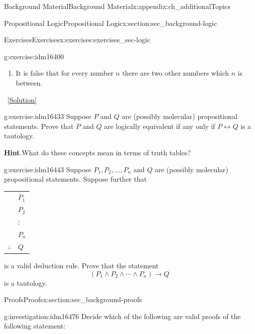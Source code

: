 \documentclass[oneside,10pt,]{book}
\numberwithin{equation}{chapter}
\newcommand{\hrulethin}  {\noalign{\hrule height 0.04em}}
\def\iff{\leftrightarrow}
\def\imp{\rightarrow}
\begin{document}
\begin{appendixptx}{Background Material}{}{Background Material}{}{}{x:appendix:ch_additionalTopics}
\begin{sectionptx}{Propositional Logic}{}{Propositional Logic}{}{}{x:section:sec_background-logic}
\begin{exercises-subsection}{Exercises}{}{Exercises}{}{}{x:exercises:exercises_sec-logic}
\begin{divisionexercise}{14}{}{}{g:exercise:idm16400}
\begin{enumerate}[label=(\alph*)]
\item{}It is false that for every number \(n\) there are two other numbers which \(n\) is between.%
\end{enumerate}
%
\qquad~\hfill{\tiny\hyperlink{g:solution:idm16419-main}{[Solution]}}\end{divisionexercise}%
\begin{divisionexercise}{15}{}{}{g:exercise:idm16433}%
Suppose \(P\) and \(Q\) are (possibly molecular) propositional statements.  Prove that \(P\) and \(Q\) are logically equivalent if any only if \(P \iff Q\) is a tautology.%
\par\smallskip%
\noindent\textbf{Hint}.\hypertarget{g:hint:idm16441}{}\quad{}What do these concepts mean in terms of truth tables?%
\end{divisionexercise}%
\begin{divisionexercise}{16}{}{}{g:exercise:idm16443}%
Suppose \(P_1, P_2, \ldots, P_n\) and \(Q\) are (possibly molecular) propositional statements.  Suppose further that%
\begin{sidebyside}{1}{0}{0}{0}%
\begin{sbspanel}{1}%
{\centering%
\begin{tabular}{ll}
&\(P_1\)\tabularnewline[0pt]
&\(P_2\)\tabularnewline[0pt]
&\(\vdots\)\tabularnewline[0pt]
&\(P_n\)\tabularnewline\hrulethin
\(\therefore\)&\(Q\)
\end{tabular}
\par}
\end{sbspanel}%
\end{sidebyside}%
\par
is a valid deduction rule.  Prove that the statement%
\begin{equation*}
(P_1 \wedge P_2 \wedge \cdots \wedge P_n) \imp Q
\end{equation*}
is a tautology.%
\end{divisionexercise}%
\end{exercises-subsection}
\end{sectionptx}
%
%
\typeout{************************************************}
\typeout{************************************************}
%
\begin{sectionptx}{Proofs}{}{Proofs}{}{}{x:section:sec_background-proofs}
\begin{introduction}{}%
\begin{investigation}{}{g:investigation:idm16476}%
Decide which of the following are valid proofs of the following statement:%
\begin{quote}%

\end{quote}
\end{investigation}
\end{introduction}
\end{sectionptx}
\end{appendixptx}
\end{document}
